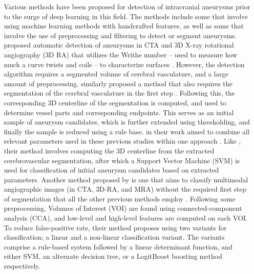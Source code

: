 Various methods have been proposed for detection of intracranial aneurysms prior to the surge of deep learning in this field. The methods include some that involve using machine learning methods with handcrafted features, as well as some that involve the use of preprocessing and filtering to detect or segment aneurysms. \citeauthor{Lauric2010} proposed automatic detection of aneurysms in CTA and 3D X-ray rotational angiography (3D RA) that utilizes the Writhe number -- used to measure how much a curve twists and coils -- to characterize surfaces \cite{Lauric2010}. However, the detection algorithm requires a segmented volume of cerebral vasculature, and a large amount of preprocessing. \citeauthor{Yang2011} similarly proposed a method that also requires the segmentation of the cerebral vasculature in the first step \cite{Yang2011}. Following this, the corresponding 3D centerline of the segmentation is computed, and used to determine vessel parts and corresponding endpoints. This serves as an initial sample of aneurysm candidates, which is further extended using thresholding, and finally the sample is reduced using a rule base. \citeauthor{Suniaga2012} in their work aimed to combine all relevant parameters used in these previous studies within one approach \cite{Suniaga2012}. Like \citeauthor{Yang2011}, their method involves computing the 3D centerline from the extracted cerebrovascular segmentation, after which a Support Vector Machine (SVM) is used for classification of initial aneurysm candidates based on extracted parameters. Another method proposed by \citeauthor{Hentschke2014} is one that aims to classify multimodal angiographic images (in CTA, 3D-RA, and MRA) without the required first step of segmentation that all the other previous methods employ \cite{Hentschke2014}. Following some preprocessing, Volumes of Interest (VOI) are found using connected-component analysis (CCA), and low-level and high-level features are computed on each VOI. To reduce false-positive rate, their method proposes using two variants for classification; a linear and a non-linear classification variant. The variants comprise a rule-based system followed by a linear determinant function, and either SVM, an alternate decision tree, or a LogitBoost boosting method respectively. 

